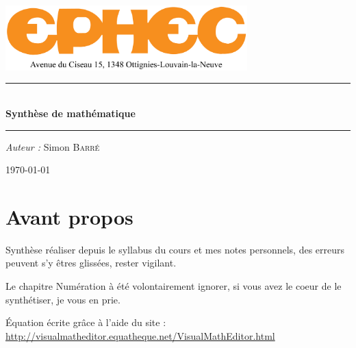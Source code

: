 \documentclass[a4paper,12pt]{article}
\newcommand\tab[1][]{\hspace*{#1}}
\begin{document}

\begin{titlepage}
\begin{center}
\includegraphics[width=0.7\textwidth]{ephec.png}\\[0.5cm]

\rule{\linewidth}{0.2mm} \\[0.4cm]
{ \huge \bfseries Synthèse de mathématique \\[0.4cm] }
\rule{\linewidth}{0.2mm} 
\vfill

\noindent
\begin{minipage}{0.4\textwidth}
  \begin{flushleft} \large
    \emph{Auteur :} Simon \textsc{Barré}\\
  \end{flushleft}
\end{minipage}
\vfill
\large
\today
\end{center}
\end{titlepage}
\renewcommand{\familydefault}{\sfdefault}

\newpage
\tableofcontents
\clearpage

\section*{Avant propos}
Synthèse réaliser depuis le syllabus du cours et mes notes personnels, des erreurs peuvent s'y êtres glissées, rester vigilant.

Le chapitre Numération à été volontairement ignorer, si vous avez le coeur de le synthétiser, je vous en prie.  

Équation écrite grâce à l'aide du site : \\ \tab[0.65cm]\url{http://visualmatheditor.equatheque.net/VisualMathEditor.html}
\end{document}
